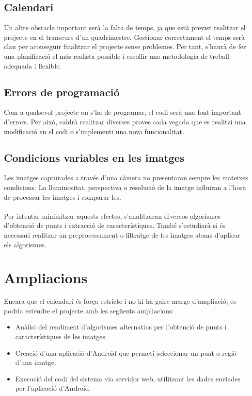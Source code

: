 	\subsection{Calendari}
		Un altre obstacle important serà la falta de temps, ja que està previst realitzar el projecte en el transcurs d'un quadrimestre. Gestionar correctament el temps serà clau per aconseguir
		finalitzar el projecte sense problemes. Per tant, s'haurà de fer una planificació el més realista possible i escollir una metodologia de treball adequada i flexible.
	\subsection{Errors de programació}
		Com a qualsevol projecte on s'ha de programar, el codi serà una font important d'errors. Per això, caldrà realitzar diverses proves cada vegada que es realitzi una modificació en el codi
		o s'implementi una nova funcionalitat.
	\subsection{Condicions variables en les imatges}
		Les imatges capturades a través d'una càmera no presentaran sempre les mateixes condicions. La lluminositat, perspectiva o resolució de la imatge 
		influiran a l'hora de processar les imatges i comparar-les.\\\\
		Per intentar minimitzar aquests efectes, s'analitzaran diversos algorismes d'obtenció de punts i extracció de característiques. 
		També s'estudiarà si és necessari realitzar un preprocessament o filtratge de les imatges abans d'aplicar els algorismes.
\section{Ampliacions}
	Encara que el calendari és força estricte i no hi ha gaire marge d'ampliació, es podria estendre el projecte amb les següents ampliacions:\\
	\begin{itemize}
		\item Anàlisi del rendiment d'algorismes alternatius per l'obtenció de punts i característiques de les imatges.
		\item Creació d'una aplicació d'Android que permeti seleccionar un punt o regió d'una imatge.
		\item Execució del codi del sistema via servidor web, utilitzant les dades enviades per l'aplicació d'Android.
	\end{itemize}
